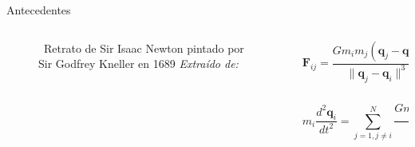 \begin{frame}{Antecedentes}
    \vspace{-0.15cm}
    \begin{columns}
        \begin{column}{0.4\textwidth}
            \centering
            \begin{figure}[H]
                \centering
                \vspace{-0.25cm}
                \caption{\tiny~Retrato de Sir Isaac Newton pintado por Sir Godfrey Kneller en 1689 \textit{Extraído de:}~\cite{cambridge_newton_kneller_2016}}%
                \label{fig:Isaac_Newton_Portrait}
            \end{figure}
        \end{column}
        \begin{column}{0.6\textwidth}
            \[\mathbf{F}_{ij} = \frac{Gm_i m_j (\mathbf{q}_j - \mathbf{q}_i)}{\|\mathbf{q}_j - \mathbf{q}_i\|^3},\]\\
            \[m_i \frac{d^2 \mathbf{q}_i}{dt^2} = \sum_{j=1, j \neq i}^{N} \frac{G m_i m_j (\mathbf{q}_j - \mathbf{q}_i)}{\|\mathbf{q}_j - \mathbf{q}_i\|^3} \]
        \end{column}
    \end{columns}
\end{frame}

